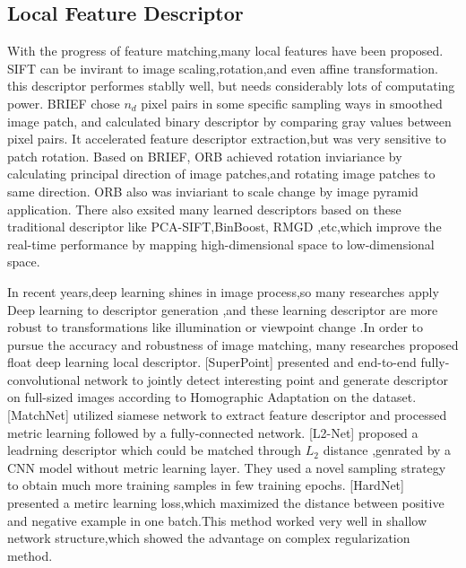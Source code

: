 \documentclass[conference]{IEEEtran}
\begin{document}
\subsection{Local Feature Descriptor}
With the progress of feature matching,many local features have been proposed. 
SIFT\cite{c6} can be invirant to image scaling,rotation,and even affine transformation. this descriptor performes stablly well, but needs considerably lots of computating power. 
BRIEF\cite{c7} chose $n_{d}$ pixel pairs in some specific sampling ways in smoothed image patch, and calculated binary descriptor by comparing gray values between pixel pairs. It accelerated feature descriptor extraction,but was very sensitive to patch rotation.  
Based on BRIEF, ORB\cite{c8} achieved rotation inviariance by calculating principal direction of image patches,and rotating image patches to same direction. ORB also was inviariant to scale change by image pyramid application.
There also exsited many learned descriptors based on these traditional descriptor like PCA-SIFT\cite{c9},BinBoost\cite{c10}, RMGD\cite{c11} ,etc,which improve the real-time performance by mapping high-dimensional space to low-dimensional space. 

In recent years,deep learning shines in image process,so many researches apply Deep learning to descriptor generation ,and these learning descriptor are more robust to transformations like illumination or viewpoint change .In order to pursue the accuracy and robustness of image matching, many researches proposed float deep learning local descriptor.
[SuperPoint]\cite{c12} presented and end-to-end fully-convolutional network to jointly detect interesting point and  generate descriptor on full-sized images according to Homographic Adaptation on the dataset.
[MatchNet]\cite{c13} utilized  siamese network to extract feature descriptor and processed metric learning followed by a fully-connected network.
[L2-Net]\cite{c14} proposed a leadrning descriptor which could be matched through $L_{2}$ distance ,genrated by a CNN model without metric learning layer. They used a novel sampling strategy to obtain much more training samples in few training epochs.
[HardNet] \cite{c15} presented a metirc learning loss,which maximized the distance between positive and negative example in one batch.This method worked very well in shallow network structure,which showed the advantage on complex regularization method.
\end{document}
